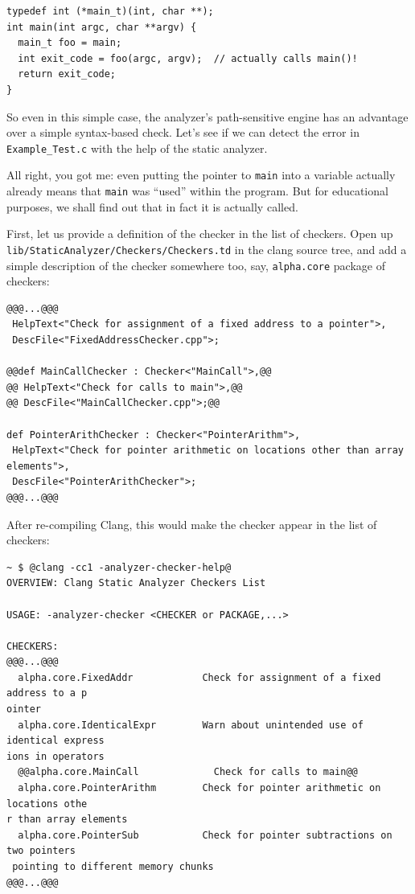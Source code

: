 \documentclass[a4paper,12pt]{article}
\newenvironment{nobr}{\begin{minipage}{\textwidth}\setlength\parskip{1em}
}{\end{minipage}\ignorespacesafterend}
\begin{document}
\begin{nobr}
\begin{lstlisting}[style=cplusplus,title=\lstinline|Example_Test.c|,numbers=none]
typedef int (*main_t)(int, char **);
int main(int argc, char **argv) {
  main_t foo = main;
  int exit_code = foo(argc, argv);  // actually calls main()!
  return exit_code;
}
\end{lstlisting}
\end{nobr}

So even in this simple case, the analyzer's path-sensitive engine has an advantage over a simple syntax-based check. Let's see if we can detect the error in \lstinline|Example_Test.c| with the help of the static analyzer.

All right, you got me: even putting the pointer to \lstinline|main| into a variable actually already means that \lstinline|main| was ``used'' within the program. But for educational purposes, we shall find out that in fact it is actually called.

\begin{nobr}
First, let us provide a definition of the checker in the list of checkers. Open up \lstinline|lib/StaticAnalyzer/Checkers/Checkers.td| in the clang source tree, and add a simple description of the checker somewhere too, say, \lstinline|alpha.core| package of checkers:
\begin{lstlisting}[style=commandline,title=\lstinline|@Checkers.td@|]
@@@...@@@
 HelpText<"Check for assignment of a fixed address to a pointer">,
 DescFile<"FixedAddressChecker.cpp">;

@@def MainCallChecker : Checker<"MainCall">,@@
@@ HelpText<"Check for calls to main">,@@
@@ DescFile<"MainCallChecker.cpp">;@@

def PointerArithChecker : Checker<"PointerArithm">,
 HelpText<"Check for pointer arithmetic on locations other than array elements">,
 DescFile<"PointerArithChecker">;
@@@...@@@
\end{lstlisting}
\end{nobr}

\begin{nobr}
After re-compiling Clang, this would make the checker appear in the list of checkers:
\begin{lstlisting}[style=commandline]
~ $ @clang -cc1 -analyzer-checker-help@
OVERVIEW: Clang Static Analyzer Checkers List

USAGE: -analyzer-checker <CHECKER or PACKAGE,...>

CHECKERS:
@@@...@@@
  alpha.core.FixedAddr            Check for assignment of a fixed address to a p
ointer
  alpha.core.IdenticalExpr        Warn about unintended use of identical express
ions in operators
  @@alpha.core.MainCall             Check for calls to main@@
  alpha.core.PointerArithm        Check for pointer arithmetic on locations othe
r than array elements
  alpha.core.PointerSub           Check for pointer subtractions on two pointers
 pointing to different memory chunks
@@@...@@@
\end{lstlisting}
\end{nobr}
\end{document}
